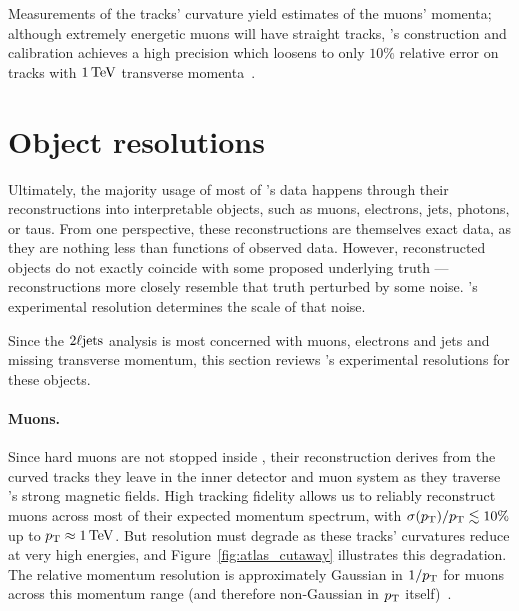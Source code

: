 Measurements of the tracks' curvature yield estimates of the muons' momenta;
although extremely energetic muons will have straight tracks,
\atlas's construction and calibration achieves a high precision which
loosens to only $10\%$ relative error on tracks with $1\,\eV[T]$ transverse
momenta~\cite{
atlas1994proposal,
atlas2008experiment,
ATL-PHYS-PUB-2015-037
}.


\section{Object resolutions}
\label{sec:atlas_object_resolutions}
Ultimately, the majority usage of most of \atlas's data happens through their
reconstructions into interpretable objects, such as muons, electrons, jets,
photons, or taus.
From one perspective, these reconstructions are themselves exact data, as they
are nothing less than functions of observed data.
However, reconstructed objects do not exactly coincide with some proposed
underlying truth --- reconstructions more closely resemble that truth perturbed
by some noise.
\atlas's experimental resolution determines the scale of that noise.

Since the $\twoljets$ analysis is most concerned with muons, electrons and
jets and missing transverse momentum,
this section reviews \atlas's experimental resolutions for these objects.

\paragraph{Muons.}
Since hard muons are not stopped inside \atlas, their reconstruction derives
from the curved tracks they leave in the inner detector and muon system as they
traverse \atlas's strong magnetic fields.
High tracking fidelity allows us to reliably reconstruct muons across most of
their expected momentum spectrum, with $\sigma(\pt) / \pt \lesssim 10\%$ up to
$\pt \approx 1\,\eV[T]$.
But resolution must degrade as these tracks' curvatures reduce at very high
energies, and Figure~\ref{fig:atlas_cutaway} illustrates this degradation.
The relative momentum resolution is approximately Gaussian in
$1 / \pt$ for muons across this momentum range
(and therefore non-Gaussian in $\pt$ itself)~\cite{atlas1999design1}.

